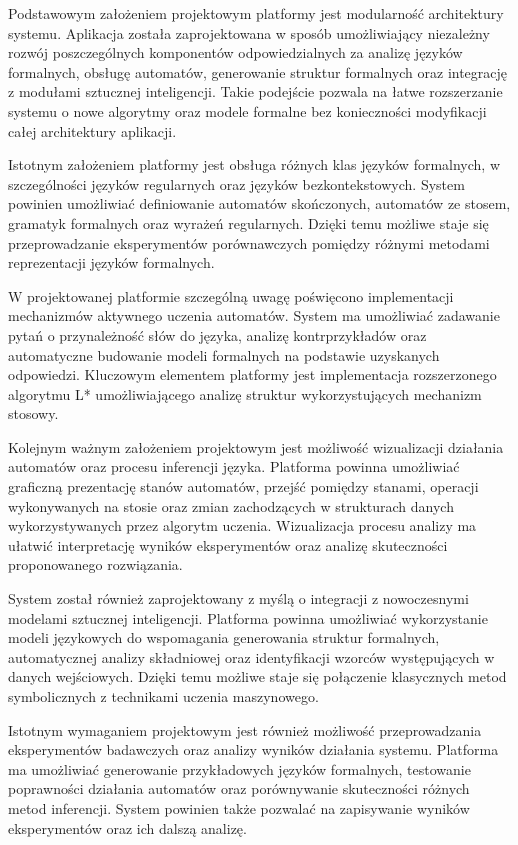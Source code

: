 \documentclass[12pt]{article}
\begin{document}
Podstawowym założeniem projektowym platformy jest modularność architektury systemu. Aplikacja została zaprojektowana w sposób umożliwiający niezależny rozwój poszczególnych komponentów odpowiedzialnych za analizę języków formalnych, obsługę automatów, generowanie struktur formalnych oraz integrację z modułami sztucznej inteligencji. Takie podejście pozwala na łatwe rozszerzanie systemu o nowe algorytmy oraz modele formalne bez konieczności modyfikacji całej architektury aplikacji.

Istotnym założeniem platformy jest obsługa różnych klas języków formalnych, w szczególności języków regularnych oraz języków bezkontekstowych. System powinien umożliwiać definiowanie automatów skończonych, automatów ze stosem, gramatyk formalnych oraz wyrażeń regularnych. Dzięki temu możliwe staje się przeprowadzanie eksperymentów porównawczych pomiędzy różnymi metodami reprezentacji języków formalnych.

W projektowanej platformie szczególną uwagę poświęcono implementacji mechanizmów aktywnego uczenia automatów. System ma umożliwiać zadawanie pytań o przynależność słów do języka, analizę kontrprzykładów oraz automatyczne budowanie modeli formalnych na podstawie uzyskanych odpowiedzi. Kluczowym elementem platformy jest implementacja rozszerzonego algorytmu L* umożliwiającego analizę struktur wykorzystujących mechanizm stosowy.

Kolejnym ważnym założeniem projektowym jest możliwość wizualizacji działania automatów oraz procesu inferencji języka. Platforma powinna umożliwiać graficzną prezentację stanów automatów, przejść pomiędzy stanami, operacji wykonywanych na stosie oraz zmian zachodzących w strukturach danych wykorzystywanych przez algorytm uczenia. Wizualizacja procesu analizy ma ułatwić interpretację wyników eksperymentów oraz analizę skuteczności proponowanego rozwiązania.

System został również zaprojektowany z myślą o integracji z nowoczesnymi modelami sztucznej inteligencji. Platforma powinna umożliwiać wykorzystanie modeli językowych do wspomagania generowania struktur formalnych, automatycznej analizy składniowej oraz identyfikacji wzorców występujących w danych wejściowych. Dzięki temu możliwe staje się połączenie klasycznych metod symbolicznych z technikami uczenia maszynowego.

Istotnym wymaganiem projektowym jest również możliwość przeprowadzania eksperymentów badawczych oraz analizy wyników działania systemu. Platforma ma umożliwiać generowanie przykładowych języków formalnych, testowanie poprawności działania automatów oraz porównywanie skuteczności różnych metod inferencji. System powinien także pozwalać na zapisywanie wyników eksperymentów oraz ich dalszą analizę.
\end{document}
